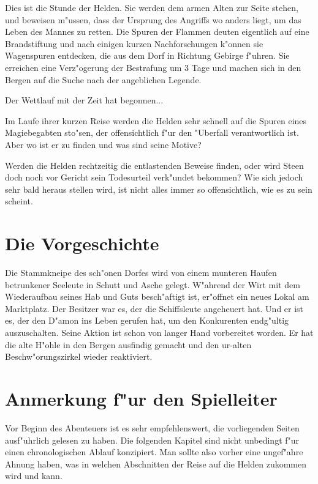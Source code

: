 \par Dies ist die Stunde der Helden. Sie werden dem armen Alten zur Seite stehen, und beweisen m"ussen, dass der Ursprung des Angriffs wo anders liegt, um das Leben des Mannes zu retten. Die Spuren der Flammen deuten eigentlich auf eine Brandstiftung und nach einigen kurzen Nachforschungen k"onnen sie Wagenspuren entdecken, die aus dem Dorf in Richtung Gebirge f"uhren. Sie erreichen eine Verz"ogerung der Bestrafung um 3 Tage und machen sich in den Bergen auf die Suche nach der angeblichen Legende.

\par Der Wettlauf mit der Zeit hat begonnen...

\par Im Laufe ihrer kurzen Reise werden die Helden sehr schnell auf die Spuren eines Magiebegabten sto"sen, der offensichtlich f"ur den "Uberfall verantwortlich ist. Aber wo ist er zu finden und was sind seine Motive?

\par Werden die Helden rechtzeitig die entlastenden Beweise finden, oder wird Steen doch noch vor Gericht sein Todesurteil verk"undet bekommen? Wie sich jedoch sehr bald heraus stellen wird, ist nicht alles immer so offensichtlich, wie es zu sein scheint.

\section{Die Vorgeschichte}
\par Die Stammkneipe des sch"onen Dorfes wird von einem munteren Haufen betrunkener Seeleute in Schutt und Asche gelegt. W"ahrend der Wirt mit dem Wiederaufbau seines Hab und Guts besch"aftigt ist, er"offnet ein neues Lokal am Marktplatz. Der Besitzer war es, der die Schiffsleute angeheuert hat. Und er ist es, der den D"amon ins Leben gerufen hat, um den Konkurenten endg"ultig auszuschalten. Seine Aktion ist schon von langer Hand vorbereitet worden. Er hat die alte H"ohle in den Bergen ausfindig gemacht und den ur-alten Beschw"orungszirkel wieder reaktiviert.

\section{Anmerkung f"ur den Spielleiter}
\par Vor Beginn des Abenteuers ist es sehr empfehlenswert, die vorliegenden Seiten ausf"uhrlich gelesen zu haben. Die folgenden Kapitel sind nicht unbedingt f"ur einen chronologischen Ablauf konzipiert. Man sollte also vorher eine ungef"ahre Ahnung haben, was in welchen Abschnitten der Reise auf die Helden zukommen wird und kann.
